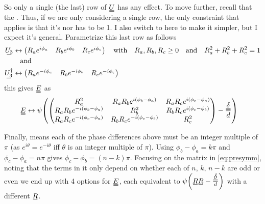 \documentclass[11pt]{article}
\begin{document}
So only a single (the last) row of $\du{U}$ has any effect.
To move further, recall that the .
Thus, if we are only considering a single row, the only constraint that applies is that it's nor has to be 1.
I also switch to  here to make it simpler, but I expect it's general.
Parametrize this last row as follows
\begin{align}
    \su{U_3} &\leftrightarrow \begin{pmatrix} R_ae^{i\phi_a} & R_be^{i\phi_b} & R_ce^{i\phi_c} \end{pmatrix} \qq{with} R_a, R_b, R_c \geq 0 \qq{and} R_a^2 + R_b^2 + R_c^2 = 1 \\
    &\qq{and} \nonumber \\
    \su{U^\dagger_3} &\leftrightarrow \begin{pmatrix} R_ae^{-i\phi_a} & R_be^{-i\phi_b} & R_ce^{-i\phi_c} \end{pmatrix}
\end{align}
this gives $\du{E}$ as
\begin{align}
    \du{E} &\leftrightarrow \psi \qty(\begin{pmatrix}
        R_a^2 & R_a R_b e^{i(\phi_b-\phi_a)} & R_a R_c e^{i(\phi_c-\phi_a)} \\
        R_a R_b e^{-i(\phi_b-\phi_a)} & R_b^2 & R_b R_c e^{i(\phi_c-\phi_b)} \\
        R_a R_c e^{-i(\phi_c-\phi_a)} & R_b R_c e^{-i(\phi_c-\phi_b)} & R_c^2
    \end{pmatrix} - \frac{\du{\delta}}{d}) \label{eq:presymm}
\end{align}

\pagebreak
Finally,  means each of the phase differences above must be an integer multiple of $\pi$ (as $e^{i\theta}=e^{-i\theta}$ iff $\theta$ is an integer multiple of $\pi$).
Using $\phi_b-\phi_a = k\pi$ and $\phi_c-\phi_a=n\pi$ gives $\phi_c-\phi_b=(n-k)\pi$.
Focusing on the matrix in \cref{eq:presymm}, noting that the terms in it only depend on whether each of $n$, $k$, $n-k$ are odd or even we end up with 4 options for $\du{E}$, each equivalent to $\psi\qty(\su{R}\su{R}-\frac{\du{\delta}}{d})$ with a different $\su{R}$.
\end{document}
